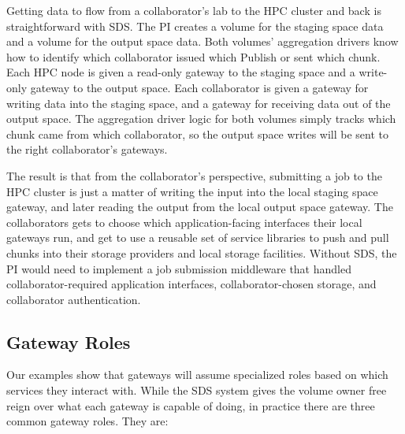 {Getting data to flow from a collaborator's lab to the HPC cluster and back is
straightforward with SDS.  The PI creates a volume for the staging space data
and a volume for the output space data.  Both volumes' aggregation drivers know
how to identify which collaborator issued which Publish or sent which chunk.
Each HPC node is given a read-only gateway to the staging space and a write-only
gateway to the output space.  Each collaborator is given a gateway for writing
data into the staging space, and a gateway for receiving data out of the output
space.  The aggregation driver logic for both volumes simply tracks which chunk
came from which collaborator, so the output space writes will be sent to the
right collaborator's gateways.

The result is that from the collaborator's perspective, submitting a job to the HPC
cluster is just a matter of writing the input into the local staging space
gateway, and later reading the output from the local output space gateway.  The
collaborators gets to choose which application-facing interfaces their local
gateways run, and get to use a reusable set of service libraries to push and pull
chunks into their storage providers and local storage facilities.
Without SDS, the PI would need to implement a job submission middleware that
handled collaborator-required application interfaces, collaborator-chosen
storage, and collaborator authentication.

\subsection{Gateway Roles}

Our examples show that gateways will assume specialized roles based on
which services they interact with.
While the SDS system gives the volume owner free reign over what each gateway is
capable of doing, in practice there are three common gateway roles.
They are:

}
